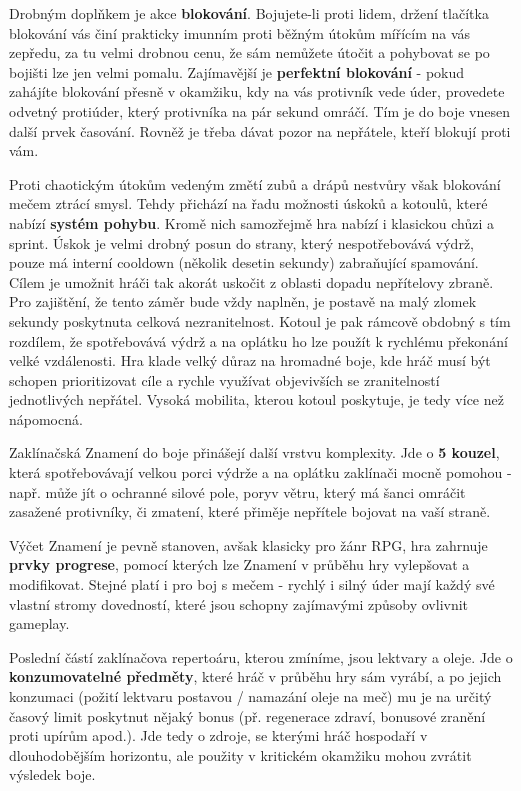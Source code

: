 Drobným doplňkem je akce \textbf{blokování}. Bojujete-li proti lidem, držení tlačítka blokování vás činí prakticky imunním proti běžným útokům mířícím na vás zepředu, za tu velmi drobnou cenu, že sám nemůžete útočit a pohybovat se po bojišti lze jen velmi pomalu. Zajímavější je \textbf{perfektní blokování} - pokud zahájíte blokování přesně v okamžiku, kdy na vás protivník vede úder, provedete odvetný protiúder, který protivníka na pár sekund omráčí. Tím je do boje vnesen další prvek časování. Rovněž je třeba dávat pozor na nepřátele, kteří blokují proti vám.
\bigbreak

Proti chaotickým útokům vedeným změtí zubů a drápů nestvůry však blokování mečem ztrácí smysl. Tehdy přichází na řadu možnosti úskoků a kotoulů, které nabízí \textbf{systém pohybu}. Kromě nich samozřejmě hra nabízí i klasickou chůzi a sprint. Úskok je velmi drobný posun do strany, který nespotřebovává výdrž, pouze má interní cooldown (několik desetin sekundy) zabraňující spamování. Cílem je umožnit hráči tak akorát uskočit z oblasti dopadu nepřítelovy zbraně. Pro zajištění, že tento záměr bude vždy naplněn, je postavě na malý zlomek sekundy poskytnuta celková nezranitelnost. Kotoul je pak rámcově obdobný s tím rozdílem, že spotřebovává výdrž a na oplátku ho lze použít k rychlému překonání velké vzdálenosti. Hra klade velký důraz na hromadné boje, kde hráč musí být schopen prioritizovat cíle a rychle využívat objevivších se zranitelností jednotlivých nepřátel. Vysoká mobilita, kterou kotoul poskytuje, je tedy více než nápomocná.  

Zaklínačská Znamení do boje přinášejí další vrstvu komplexity. Jde o \textbf{5 kouzel}, která spotřebovávají velkou porci výdrže a na oplátku zaklínači mocně pomohou - např. může jít o ochranné silové pole, poryv větru, který má šanci omráčit zasažené protivníky, či zmatení, které přiměje nepřítele bojovat na vaší straně.

Výčet Znamení je pevně stanoven, avšak klasicky pro žánr \acs{RPG}, hra zahrnuje \textbf{prvky progrese}, pomocí kterých lze Znamení v průběhu hry vylepšovat a modifikovat. Stejné platí i pro boj s mečem - rychlý i silný úder mají každý své vlastní stromy dovedností, které jsou schopny zajímavými způsoby ovlivnit gameplay. 

Poslední částí zaklínačova repertoáru, kterou zmíníme, jsou lektvary a oleje. Jde o \textbf{konzumovatelné předměty}, které hráč v průběhu hry sám vyrábí, a po jejich konzumaci (požití lektvaru postavou / namazání oleje na meč) mu je na určitý časový limit poskytnut nějaký bonus (př. regenerace zdraví, bonusové zranění proti upírům apod.). Jde tedy o zdroje, se kterými hráč hospodaří v dlouhodobějším horizontu, ale použity v kritickém okamžiku mohou zvrátit výsledek boje. 

